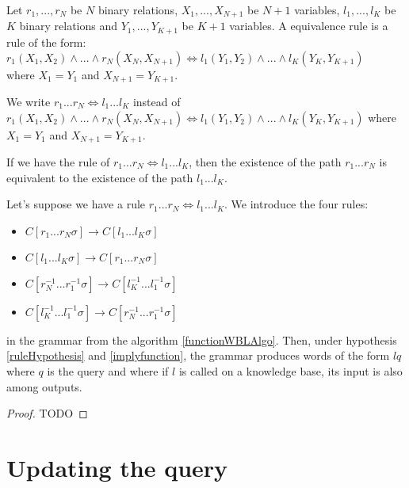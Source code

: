 \documentclass[10pt,a4paper,draft]{article}
\begin{document}
\begin{definition}
Let $r_1,..., r_N$ be $N$ binary relations, $X_1,..., X_{N+1}$ be $N+1$ variables, $l_1,..., l_K$ be $K$ binary relations and $Y_1,..., Y_{K+1}$ be $K+1$ variables. A equivalence rule is a rule of the form: \\
$r_1(X_1, X_2) \wedge ... \wedge r_N(X_N, X_{N+1}) \Leftrightarrow l_1(Y_1, Y_2) \wedge ... \wedge l_K(Y_K, Y_{K+1})$ \\
where $X_1 = Y_1$ and $X_{N+1} = Y_{K+1}$.
\end{definition}

\begin{notation}
We write $r_1 ... r_N \Leftrightarrow l_1 ... l_K$ instead of $r_1(X_1, X_2) \wedge ... \wedge r_N(X_N, X_{N+1}) \Leftrightarrow l_1(Y_1, Y_2) \wedge ... \wedge l_K(Y_K, Y_{K+1})$ where $X_1 = Y_1$ and $X_{N+1} = Y_{K+1}$.
\end{notation}

\begin{hypothesis}
\label{ruleHypothesis}
If we have the rule of $r_1 ... r_N \Leftrightarrow l_1 ... l_K$, then the existence of the path $r_1 ... r_N$ is equivalent to the existence of the path $l_1 ... l_K$.
\end{hypothesis}

\begin{property}
Let's suppose we have a rule $r_1 ... r_N \Leftrightarrow l_1 ... l_K$. We introduce the four rules:
\begin{itemize}
\item $C[r_1...r_N \sigma] \rightarrow C[l_1 ... l_K \sigma]$
\item $C[l_1 ... l_K \sigma] \rightarrow C[r_1...r_N \sigma]$
\item $C[r_N^{-1} ... r_1^{-1} \sigma] \rightarrow C[l_K^{-1} ... l_1^{-1} \sigma]$
\item $C[l_K^{-1} ... l_1^{-1} \sigma] \rightarrow C[r_N^{-1} ... r_1^{-1} \sigma]$
\end{itemize}
in the grammar from the algorithm \ref{functionWBLAlgo}. Then, under hypothesis \ref{ruleHypothesis} and \ref{implyfunction}, the grammar produces words of the form $lq$ where $q$ is the query and where if $l$ is called on a knowledge base, its input is also among outputs.
\end{property}

\begin{proof}
TODO
\end{proof}

\section{Updating the query}
\end{document}
